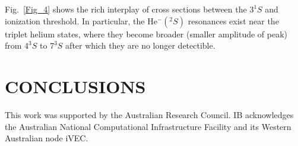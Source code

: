 \documentclass[aip
, pra
, showpacs
, aps
, twocolumn
, groupedaddress
, floatfix
]{revtex4}
\begin{document}
Fig.~\ref{Fig_4} shows the rich interplay of cross sections between the $3^1S$ and ionization threshold.
In particular, the He$^-(^2S)$ resonances exist near the triplet helium states, where they become broader (smaller amplitude of peak)
from $4^3S$ to $7^3S$ after which they are no longer detectible.

\section{CONCLUSIONS}






\begin{acknowledgments}
This work was supported by the Australian Research Council. IB
acknowledges the Australian National Computational Infrastructure
Facility and its Western Australian node iVEC.
\end{acknowledgments}





\end{document}
